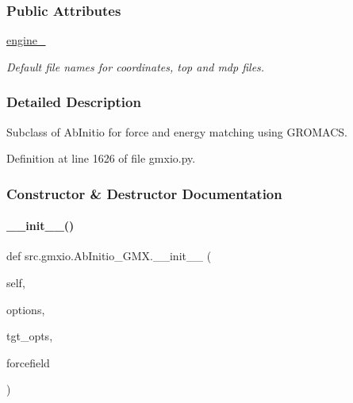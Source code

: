 \subsubsection*{Public Attributes}
\begin{DoxyCompactItemize}
\item 
\hyperlink{classsrc_1_1gmxio_1_1AbInitio__GMX_a6773f593d20829cb39682e122ccaf934}{engine\+\_\+}
\begin{DoxyCompactList}\small\item\em Default file names for coordinates, top and mdp files. \end{DoxyCompactList}\end{DoxyCompactItemize}


\subsubsection{Detailed Description}
Subclass of Ab\+Initio for force and energy matching using G\+R\+O\+M\+A\+CS. 



Definition at line 1626 of file gmxio.\+py.



\subsubsection{Constructor \& Destructor Documentation}
\mbox{\label{classsrc_1_1gmxio_1_1AbInitio__GMX_ac2e952e1bcc52afc4c07aa7c7a7c7692}} 
\paragraph{\texorpdfstring{\+\_\+\+\_\+init\+\_\+\+\_\+()}{\_\_init\_\_()}}
{\footnotesize\ttfamily def src.\+gmxio.\+Ab\+Initio\+\_\+\+G\+M\+X.\+\_\+\+\_\+init\+\_\+\+\_\+ (\begin{DoxyParamCaption}\item[{}]{self,  }\item[{}]{options,  }\item[{}]{tgt\+\_\+opts,  }\item[{}]{forcefield }\end{DoxyParamCaption})}



